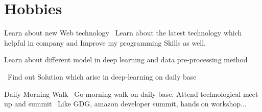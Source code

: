 \documentclass[]{cv-style}          %
\begin{document}


\section{Hobbies}
  \vspace{-0.2cm}

\begin{entrylist}

\entry
  {}
  {Learn about new Web technology }
  {}
  {\jobtitle{}\ Learn about the latest technology which helpful in company and Improve my
     programming Skills as well.}
  
  \entry
  {}
  {Learn about different model in deep learning and data pre-processing method  }
  {}
  {\jobtitle{}\ Find out Solution which arise in deep-learning on daily base 
  \begin{itemize}

     
     
  \end{itemize}}
  \entry
  {}
  {Daily Morning Walk }
  {}
  {\jobtitle{}\ Go morning walk on daily base. }
  \entry
  {}
  {Attend technological meet up and summit }
  {}
  {\jobtitle{}\ Like GDG, amazon developer summit, hands on workshop... }
  

\end{entrylist}
\end{document}

